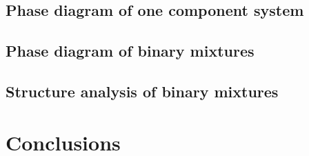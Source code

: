 \documentclass[aip,jcp,12pt]{revtex4-1}
\begin{document}
\subsection{Phase diagram of one component system}
\subsection{Phase diagram of binary mixtures}
\subsection{Structure analysis of binary mixtures}


\section{Conclusions}







\end{document}
